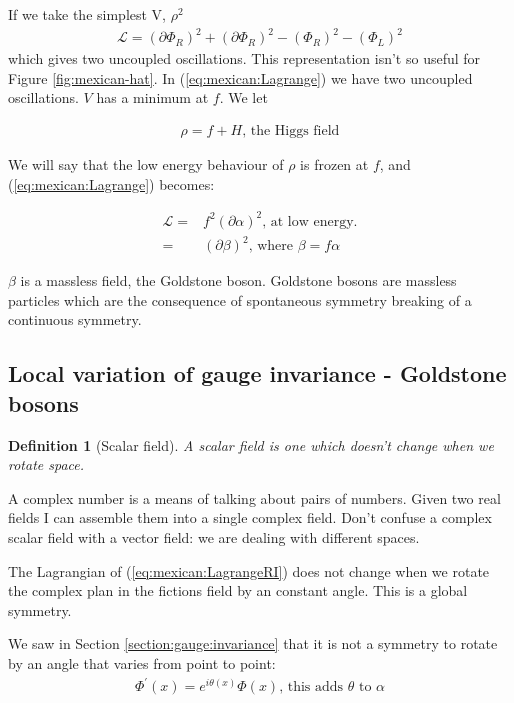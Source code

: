 \documentclass[]{article}
\newtheorem{defn}[thm]{Definition}
\begin{document}
If we take the simplest V, $\rho^2$
\begin{align*}
	\mathcal{L} = (\partial \Phi_R)^2 +  (\partial \Phi_R)^2 -(\Phi_R)^2  -(\Phi_L)^2
\end{align*}
which gives two uncoupled oscillations. This representation isn't so useful for Figure \ref{fig:mexican-hat}. In (\ref{eq:mexican:Lagrange}) we have two uncoupled oscillations. $V$ has a minimum at $f$. We let

\begin{align*}
	\rho = f + H \text{, the Higgs field}
\end{align*}

We will say that the low energy behaviour of $\rho$ is frozen at $f$, and (\ref{eq:mexican:Lagrange}) becomes:

\begin{align*}
	\mathcal{L} =& f^2(\partial \alpha)^2 \text{, at low energy.}\\
	=& (\partial \beta)^2 \text{, where $\beta = f \alpha$}
\end{align*}

$\beta$ is a massless field, the Goldstone boson. Goldstone bosons are massless particles which are the consequence of spontaneous symmetry breaking of a continuous symmetry.

\subsection{Local variation of gauge invariance - Goldstone bosons}

\begin{defn}[Scalar field]
	A scalar field is one which doesn't change when we rotate space.
\end{defn}

A complex number is a means of talking about pairs of numbers. Given two real fields I can assemble them into a single complex field. Don't confuse a complex scalar field with a vector field: we are dealing with different spaces.

The Lagrangian of (\ref{eq:mexican:LagrangeRI})  does not change when we rotate the complex plan in the fictions field by an constant angle. This is a global symmetry.

We saw in Section \ref{section:gauge:invariance} that it is not a  symmetry to rotate by an angle that varies from point to point:
\begin{align*}
	\Phi^\prime (x) = e^{i\theta(x)} \Phi(x) \text{, this adds $\theta$ to $\alpha$}
\end{align*}
\end{document}
